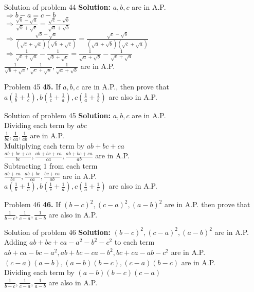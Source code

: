 \documentclass[aspectratio=1610,8pt]{beamer}
\begin{document}
\begin{frame}{Solution of problem 44}
  \textbf{Solution:} $a, b, c$ are in A.P.\\
  $\Rightarrow b - a = c - b$\\
  $\Rightarrow \frac{\sqrt{b} - \sqrt{a}}{\sqrt{b} + \sqrt{c}} = \frac{\sqrt{c}
    - \sqrt{b}}{\sqrt{a} + \sqrt{b}}$\\
  $\Rightarrow \frac{\sqrt{b} - \sqrt{a}}{(\sqrt{c} + \sqrt{a})(\sqrt{b} +
    \sqrt{c})} = \frac{\sqrt{c} - \sqrt{b}}{(\sqrt{a} + \sqrt{b})(\sqrt{c} +
    \sqrt{a})}$\\
  $\Rightarrow \frac{1}{\sqrt{c} + \sqrt{a}} - \frac{1}{\sqrt{b} + \sqrt{c}} =
  \frac{1}{\sqrt{a} + \sqrt{b}} - \frac{1}{\sqrt{c} + \sqrt{a}}$\\
  $\frac{1}{\sqrt{b} + \sqrt{c}}, \frac{1}{\sqrt{c} + \sqrt{a}},
  \frac{1}{\sqrt{a} + \sqrt{b}}$ are in A.P.
\end{frame}
\begin{frame}{Problem 45}
  \textbf{45.} If $a, b, c$ are in A.P., then prove that $a\left(\frac{1}{b} +
  \frac{1}{c}\right), b\left(\frac{1}{c} + \frac{1}{a}\right),
  c\left(\frac{1}{a} + \frac{1}{b}\right)$ are also in A.P.
\end{frame}
\begin{frame}{Solution of problem 45}
  \textbf{Solution:} $a, b, c$ are in A.P.\\
  Dividing each term by $abc$\\
  $\frac{1}{bc}, \frac{1}{ca}, \frac{1}{ab}$ are in A.P.\\
  Multiplying each term by $ab +bc + ca$\\
  $\frac{ab + bc + ca}{bc}, \frac{ab + bc + ca}{ca}, \frac{ab + bc + ca}{ab}$
  are in A.P.\\
  Subtracting $1$ from each term\\
  $\frac{ab + ca}{bc}, \frac{ab + bc}{ca}, \frac{bc + ca}{ab}$ are in A.P.\\
  $a\left(\frac{1}{b} + \frac{1}{c}\right), b\left(\frac{1}{c} +
  \frac{1}{a}\right), c\left(\frac{1}{a} + \frac{1}{b}\right)$ are also in
  A.P.
\end{frame}
\begin{frame}{Problem 46}
  \textbf{46.} If $(b - c)^2, (c - a)^2, (a - b)^2$ are in A.P. then prove that
  $\frac{1}{b - c}, \frac{1}{c - a}, \frac{1}{a - b}$ are also in A.P.
\end{frame}
\begin{frame}{Solution of problem 46}
  \textbf{Solution:} $(b - c)^2, (c - a)^2, (a - b)^2$ are in A.P.\\
  Adding $ab + bc + ca - a^2 - b^2 - c^2$ to each term\\
  $ab + ca - bc - a^2, ab + bc - ca - b^2, bc + ca - ab - c^2$ are in A.P.\\
  $(c - a)(a - b), (a - b)(b - c), (c - a)(b - c)$ are in A.P.\\
  Dividing each term by $(a - b)(b - c)(c - a)$\\
  $\frac{1}{b - c}, \frac{1}{c - a}, \frac{1}{a - b}$ are also in A.P.
\end{frame}
\end{document}
